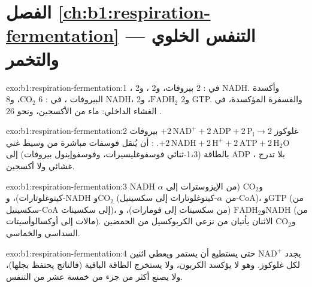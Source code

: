\section*{الفصل \ref{ch:b1:respiration-fermentation} --- التنفس الخلوي والتخمر}

\begin{solution}{exo:b1:respiration-fermentation:1}
، في : 2 بيروفات، و2 ، و2 NADH. وأكسدة
البيروفات ، في : 6 $\mathrm{CO_2}$، و8 NADH،
و2 $\mathrm{FADH_2}$، و2 GTP. والفسفرة المؤكسدة، في الغشاء الداخلي:
ماء من الأكسجين، ونحو 26 .
\end{solution}

\begin{solution}{exo:b1:respiration-fermentation:2}
غلوكوز $+ 2\,\mathrm{NAD^+} + 2\,\mathrm{ADP} + 2\,\mathrm{P_i} \to
2$ بيروفات $+ 2\,\mathrm{NADH} + 2\,\mathrm{H^+} + 2\,\mathrm{ATP} +
2\,\mathrm{H_2O}$. : أن يُنقل فوسفات مباشرة
من وسيط غني بالطاقة (1،3-ثنائي فوسفوغليسيرات، وفوسفوإينول بيروفات)
إلى ADP ، بلا تدرج غشائي ولا أكسجين.
\end{solution}

\begin{solution}{exo:b1:respiration-fermentation:3}
NADH و$\mathrm{CO_2}$ (من الإيزوسترات إلى $\alpha$-كيتوغلوتارات)،
وNADH و$\mathrm{CO_2}$ (من $\alpha$-كيتوغلوتارات إلى سكسينيل-CoA)،
وGTP (من سكسينيل-CoA إلى سكسينات)، و$\mathrm{FADH_2}$ (من سكسينات
إلى فومارات)، وNADH (من مالات إلى أوكسالوأسيتات). و$\mathrm{CO_2}$
الاثنان يأتيان من نزعي الكربوكسيل من الحمضين السداسي والخماسي.
\end{solution}

\begin{solution}{exo:b1:respiration-fermentation:4}
يجدد $\mathrm{NAD^+}$ حتى يستطيع  أن يستمر ويعطي 
اثنين لكل غلوكوز. وهو لا يؤكسد الكربون، ولا يستخرج الطاقة الباقية
(فالناتج يحتفظ بجلها)، ولا يصنع أكثر من جزء من خمسة عشر من 
التنفس.
\end{solution}

